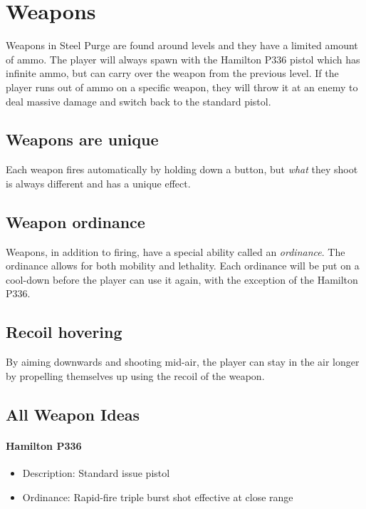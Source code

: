 \documentclass[../Main.tex]{subfiles}
\begin{document}
\section{Weapons}

Weapons in Steel Purge are found around levels and they have a limited amount of ammo. The player will always spawn with the Hamilton P336 pistol which has infinite ammo, but can carry over the weapon from the previous level. If the player runs out of ammo on a specific weapon, they will throw it at an enemy to deal massive damage and switch back to the standard pistol. 

\subsection{Weapons are unique}

Each weapon fires automatically by holding down a button, but \emph{what} they shoot is always different and has a unique effect. 

\subsection{Weapon ordinance}

Weapons, in addition to firing, have a special ability called an \emph{ordinance}. The ordinance allows for both mobility and lethality. Each ordinance will be put on a cool-down before the player can use it again, with the exception of the Hamilton P336.

\subsection{Recoil hovering}

By aiming downwards and shooting mid-air, the player can stay in the air longer by propelling themselves up using the recoil of the weapon. 

\subsection{All Weapon Ideas}

\paragraph{Hamilton P336}

\begin{itemize}
	\item Description: Standard issue pistol
	\item Ordinance: Rapid-fire triple burst shot effective at close range
\end{itemize} 
\end{document}
